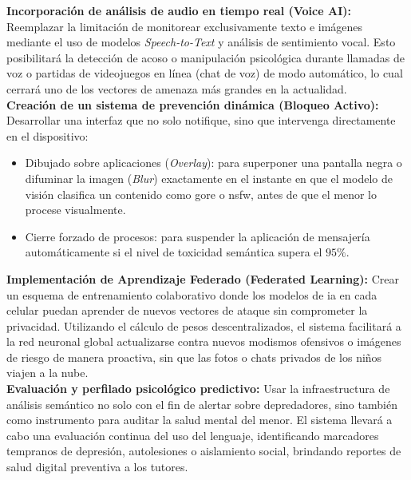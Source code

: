\textbf{Incorporación de análisis de audio en tiempo real (Voice AI):} Reemplazar la limitación de monitorear exclusivamente texto e imágenes mediante el uso de modelos \textit{Speech-to-Text} y análisis de sentimiento vocal. Esto posibilitará la detección de acoso o manipulación psicológica durante llamadas de voz o partidas de videojuegos en línea (chat de voz) de modo automático, lo cual cerrará uno de los vectores de amenaza más grandes en la actualidad. \\

\textbf{Creación de un sistema de prevención dinámica (Bloqueo Activo):} Desarrollar una interfaz que no solo notifique, sino que intervenga directamente en el dispositivo:
\begin{itemize}
    \item Dibujado sobre aplicaciones (\textit{Overlay}): para superponer una pantalla negra o difuminar la imagen (\textit{Blur}) exactamente en el instante en que el modelo de visión clasifica un contenido como \gls{gore} o \gls{nsfw}, antes de que el menor lo procese visualmente.
    \item Cierre forzado de procesos: para suspender la aplicación de mensajería automáticamente si el nivel de toxicidad semántica supera el $95\%$.
\end{itemize}

\textbf{Implementación de Aprendizaje Federado (Federated Learning):} Crear un esquema de entrenamiento colaborativo donde los modelos de \gls{ia} en cada celular puedan aprender de nuevos vectores de ataque sin comprometer la privacidad. Utilizando el cálculo de pesos descentralizados, el sistema facilitará a la red neuronal global actualizarse contra nuevos modismos ofensivos o imágenes de riesgo de manera proactiva, sin que las fotos o chats privados de los niños viajen a la nube. \\

\textbf{Evaluación y perfilado psicológico predictivo:} Usar la infraestructura de análisis semántico no solo con el fin de alertar sobre depredadores, sino también como instrumento para auditar la salud mental del menor. El sistema llevará a cabo una evaluación continua del uso del lenguaje, identificando marcadores tempranos de depresión, autolesiones o aislamiento social, brindando reportes de salud digital preventiva a los tutores.